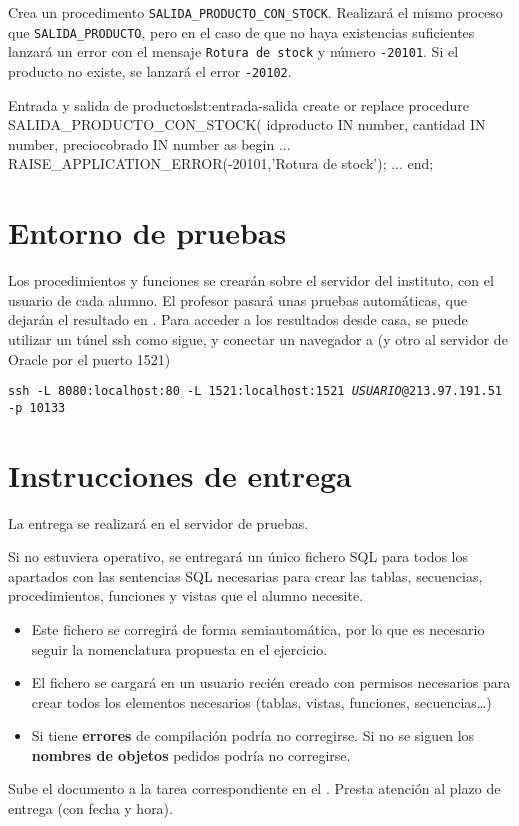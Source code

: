 \begin{homeworkProblem}

  Crea un procedimento \texttt{SALIDA\_PRODUCTO\_CON\_STOCK}. Realizará el mismo proceso que \texttt{SALIDA\_PRODUCTO}, pero en el caso de que no haya existencias suficientes lanzará un error con el mensaje \texttt{Rotura de stock} y número \texttt{-20101}. 
  Si el producto no existe, se lanzará el error \texttt{-20102}.

  \begin{listadosql}{Entrada y salida de productos}{lst:entrada-salida}
create or replace procedure SALIDA_PRODUCTO_CON_STOCK(
  idproducto IN number,
  cantidad IN number,
  preciocobrado IN number
as
begin
  ...
  RAISE_APPLICATION_ERROR(-20101,'Rotura de stock');
  ...
end; 
  \end{listadosql}
  
\end{homeworkProblem}

\section{Entorno de pruebas}
Los procedimientos y funciones se crearán sobre el servidor del instituto, con el usuario de cada alumno. El profesor pasará unas pruebas automáticas, que dejarán el resultado en . Para acceder a los resultados desde casa, se puede utilizar un túnel ssh como sigue, y conectar un navegador a  (y otro al servidor de Oracle por el puerto 1521)
\begin{center}
\texttt{ssh -L 8080:localhost:80 -L 1521:localhost:1521 \textit{USUARIO}@213.97.191.51 -p 10133}
\end{center}

\section{Instrucciones de entrega}
La entrega se realizará en el servidor de pruebas.

Si no estuviera operativo, se entregará un único fichero SQL para todos los apartados con las sentencias SQL necesarias para crear las tablas, secuencias, procedimientos, funciones y vistas que el alumno necesite.
\begin{itemize}
\item Este fichero se corregirá de forma semiautomática, por lo que es necesario seguir la nomenclatura propuesta en el ejercicio.
\item El fichero se cargará en un usuario recién creado con permisos necesarios para crear todos los elementos necesarios (tablas, vistas, funciones, secuencias\dots)
\item Si tiene \textbf{errores} de compilación podría no corregirse. Si no se siguen los \textbf{nombres de objetos} pedidos podría no corregirse.
\end{itemize}

Sube el documento a la tarea correspondiente en el .
Presta atención al plazo de entrega (con fecha y hora).







